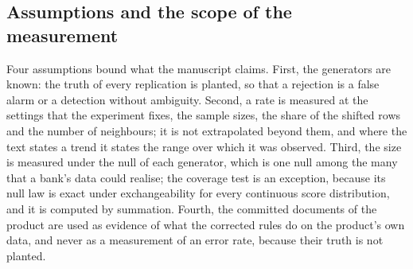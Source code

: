 \subsection{Assumptions and the scope of the measurement}

Four assumptions bound what the manuscript claims. First, the generators are known: the truth of every replication is planted, so that a rejection is a false alarm or a detection without ambiguity. Second, a rate is measured at the settings that the experiment fixes, the sample sizes, the share of the shifted rows and the number of neighbours; it is not extrapolated beyond them, and where the text states a trend it states the range over which it was observed. Third, the size is measured under the null of each generator, which is one null among the many that a bank's data could realise; the coverage test is an exception, because its null law is exact under exchangeability for every continuous score distribution, and it is computed by summation. Fourth, the committed documents of the product are used as evidence of what the corrected rules do on the product's own data, and never as a measurement of an error rate, because their truth is not planted.
